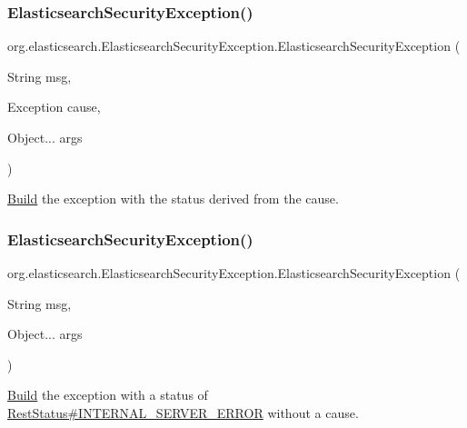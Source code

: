 \subsubsection{\texorpdfstring{Elasticsearch\+Security\+Exception()}{ElasticsearchSecurityException()}\hspace{0.1cm}{\footnotesize\ttfamily [2/5]}}
{\footnotesize\ttfamily org.\+elasticsearch.\+Elasticsearch\+Security\+Exception.\+Elasticsearch\+Security\+Exception (\begin{DoxyParamCaption}\item[{String}]{msg,  }\item[{Exception}]{cause,  }\item[{Object...}]{args }\end{DoxyParamCaption})}

\hyperlink{classorg_1_1elasticsearch_1_1_build}{Build} the exception with the status derived from the cause. \hypertarget{classorg_1_1elasticsearch_1_1_elasticsearch_security_exception_a88a789031337b5b83af8ae7a6e0d901f}{}\label{classorg_1_1elasticsearch_1_1_elasticsearch_security_exception_a88a789031337b5b83af8ae7a6e0d901f} 
\subsubsection{\texorpdfstring{Elasticsearch\+Security\+Exception()}{ElasticsearchSecurityException()}\hspace{0.1cm}{\footnotesize\ttfamily [3/5]}}
{\footnotesize\ttfamily org.\+elasticsearch.\+Elasticsearch\+Security\+Exception.\+Elasticsearch\+Security\+Exception (\begin{DoxyParamCaption}\item[{String}]{msg,  }\item[{Object...}]{args }\end{DoxyParamCaption})}

\hyperlink{classorg_1_1elasticsearch_1_1_build}{Build} the exception with a status of \hyperlink{}{Rest\+Status\#\+I\+N\+T\+E\+R\+N\+A\+L\+\_\+\+S\+E\+R\+V\+E\+R\+\_\+\+E\+R\+R\+OR} without a cause. \hypertarget{classorg_1_1elasticsearch_1_1_elasticsearch_security_exception_a27d286caffe43a68193b8d71e7859e5a}{}\label{classorg_1_1elasticsearch_1_1_elasticsearch_security_exception_a27d286caffe43a68193b8d71e7859e5a} 
